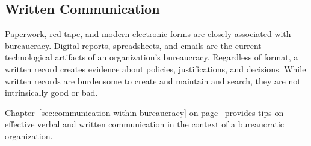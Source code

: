 \subsection*{Written Communication\label{sec:written-communication}}

Paperwork,  \href{https://en.wikipedia.org/wiki/Red_tape}{red tape}, and modern electronic forms are closely associated with bureaucracy.
Digital reports, spreadsheets, and emails are the current technological artifacts of an organization's bureaucracy. Regardless of format, a written record creates evidence about policies, justifications, and decisions. %
While written records are burdensome to create and maintain and search, they are not intrinsically good or bad. 

Chapter~\ref{sec:communication-within-bureaucracy} on 
page~\pageref{sec:communication-within-bureaucracy} 
provides tips on effective verbal and written communication in the context of a bureaucratic organization. 